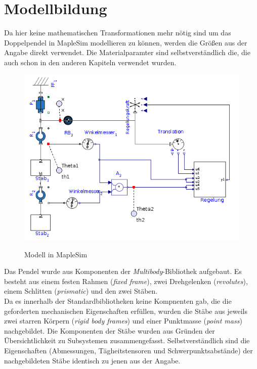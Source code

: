 \documentclass[a4paper, 10pt]{report}
\begin{document}
\section{Modellbildung}
Da hier keine mathematischen Transformationen mehr nötig sind um das Doppelpendel in MapleSim modellieren zu können, werden die Größen aus der Angabe direkt verwendet. Die Materialparamter sind selbstverständlich die, die auch schon in den anderen Kapiteln verwendet wurden. \\
\begin{figure}[h]
\centering  %
\label{MapleSimModell}
{\includegraphics[width=\textwidth]{MapleSimModel}}
\caption{Modell in MapleSim}
\end{figure}
\newpage \noindent
Das Pendel wurde aus Komponenten der \textit{Multibody}-Bibliothek aufgebaut. Es besteht aus einem festen Rahmen (\textit{fixed frame}), zwei Drehgelenken (\textit{revolutes}), einem Schlitten (\textit{prismatic}) und den zwei Stäben. \\
Da es innerhalb der Standardbibliotheken keine Kompnenten gab, die die geforderten mechanischen Eigenschaften erfüllen, wurden die Stäbe aus jeweils zwei starren Körpern (\textit{rigid body frames}) und einer Punktmasse (\textit{point mass}) nachgebildet. Die Komponenten der Stäbe wurden aus Gründen der Übersichtlichkeit zu Subsystemen zusammengefasst. Selbstverständlich sind die Eigenschaften (Abmessungen, Tägheitstensoren und Schwerpunktsabstände) der nachgebildeten Stäbe identisch zu jenen aus der Angabe.
\end{document}
